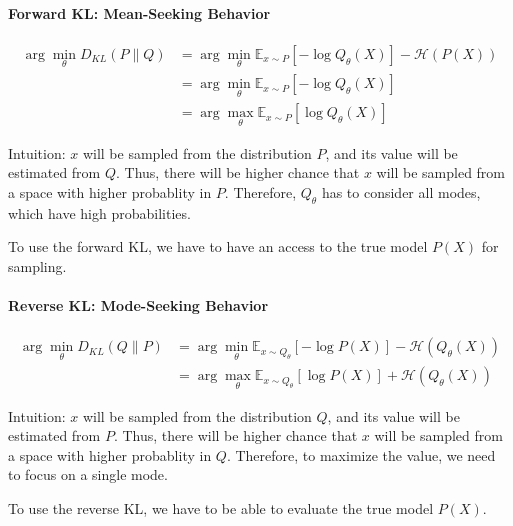 \paragraph{Forward KL: Mean-Seeking Behavior}
\begin{align*}
\arg\min_{\theta}D_{KL}(P \| Q) &= \arg\min_{\theta} \mathbb{E}_{x \sim P}[-\log Q_\theta(X)] - \mathcal{H}(P(X))\\
&= \arg\min_{\theta} \mathbb{E}_{x \sim P}[-\log Q_\theta(X)]\\
&= \arg\max_{\theta} \mathbb{E}_{x \sim P}[\log Q_\theta(X)]
\end{align*}

Intuition: $x$ will be sampled from the distribution $P$, and its value will be estimated from $Q$. Thus, there will be higher chance that $x$ will be sampled from a space with higher probablity in $P$. Therefore, $Q_\theta$ has to consider all modes, which have high probabilities. 

To use the forward KL, we have to have an access to the true model $P(X)$ for sampling. 

\paragraph{Reverse KL: Mode-Seeking Behavior}
\begin{align*}
\arg\min_{\theta}D_{KL}(Q \| P) &= \arg\min_{\theta} \mathbb{E}_{x \sim Q_\theta}[-\log P(X)] - \mathcal{H}(Q_\theta(X))\\
&= \arg\max_{\theta} \mathbb{E}_{x \sim Q_\theta}[\log P(X)] + \mathcal{H}(Q_{\theta}(X))
\end{align*}

Intuition: $x$ will be sampled from the distribution $Q$, and its value will be estimated from $P$. Thus, there will be higher chance that $x$ will be sampled from a space with higher probablity in $Q$. Therefore, to maximize the value, we need to focus on a single mode.  

To use the reverse KL, we have to be able to evaluate the true model $P(X)$. 


